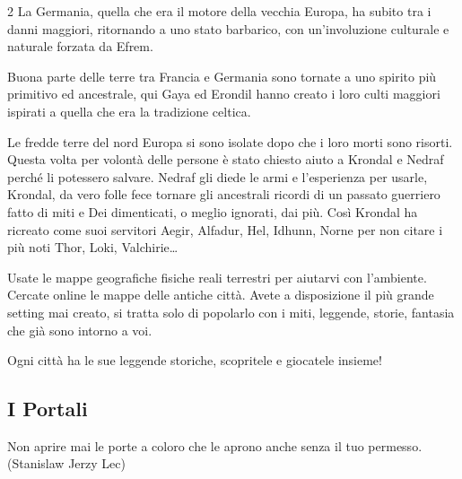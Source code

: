 \begin{multicols}{2}
La Germania, quella che era il motore della vecchia Europa, ha subito tra i danni maggiori, ritornando a uno stato barbarico, con un'involuzione culturale e naturale forzata da Efrem.

Buona parte delle terre tra Francia e Germania sono tornate a uno spirito più primitivo ed ancestrale, qui Gaya ed Erondil hanno creato i loro culti maggiori ispirati a quella che era la tradizione celtica.

Le fredde terre del nord Europa si sono isolate dopo che i loro morti sono risorti. Questa volta per volontà delle persone è stato chiesto aiuto a Krondal e Nedraf perché li potessero salvare. Nedraf gli diede le armi e l'esperienza per usarle, Krondal, da vero folle fece tornare gli ancestrali ricordi di un passato guerriero fatto di miti e Dei dimenticati, o meglio ignorati, dai più.
Così Krondal ha ricreato come suoi servitori Aegir, Alfadur, Hel, Idhunn, Norne per non citare i più noti Thor, Loki, Valchirie…

\begin{narratore}
Usate le mappe geografiche fisiche reali terrestri per aiutarvi con l'ambiente. Cercate online le mappe delle antiche città. Avete a disposizione il più grande setting mai creato, si tratta solo di popolarlo con i miti, leggende, storie, fantasia che già sono intorno a voi.

Ogni città ha le sue leggende storiche, scopritele e giocatele insieme!
\end{narratore}

\end{multicols}

\subsection{I Portali}

\begin{enfasi}{
Non aprire mai le porte a coloro che le aprono anche senza il tuo permesso. (Stanislaw Jerzy Lec)}\end{enfasi}

